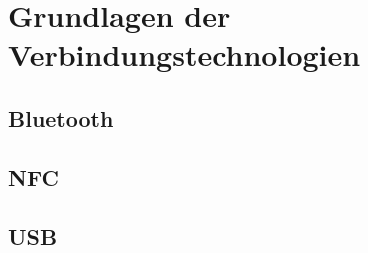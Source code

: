 \section{Grundlagen der Verbindungstechnologien}
		
		\subsection{Bluetooth}
		
		\subsection{NFC}
		
		\subsection{USB}
